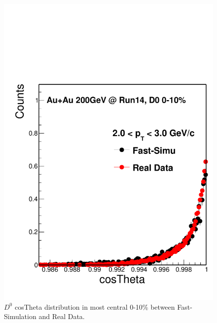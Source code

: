 \documentclass[a4paper]{article}
\begin{document}
\begin{figure}[htbp]
\begin{minipage}[htbp]{0.52\linewidth}
\centering
\includegraphics[width=1.0\textwidth,angle=0]{fig/pointingangle.pdf}
\caption{ $D^0$ cosTheta distribution in most central 0-10\% between Fast-Simulation and Real Data.\label{pointingangle}}
\end{minipage}
\hfill
\begin{minipage}[htbp]{0.52\linewidth}
\centering

\end{minipage}
\end{figure}
\end{document}
